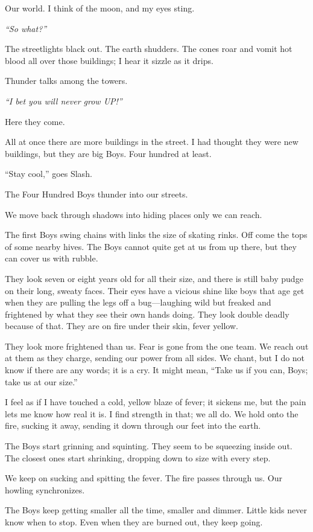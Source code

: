 Our world. I think of the moon, and my eyes sting.

\textit{``So what?''}

The streetlights black out. The earth shudders. The cones roar and vomit hot blood all over those buildings; I hear it sizzle as it drips.

Thunder talks among the towers.

\textit{``I bet you will never grow UP!''}

Here they come.

All at once there are more buildings in the street. I had thought they were new buildings, but they are big Boys. Four hundred at least.

``Stay cool,'' goes Slash.

The Four Hundred Boys thunder into our streets.

We move back through shadows into hiding places only we can reach.

The first Boys swing chains with links the size of skating rinks. Off come the tops of some nearby hives. The Boys cannot quite get at us from up there, but they can cover us with rubble.

They look seven or eight years old for all their size, and there is still baby pudge on their long, sweaty faces. Their eyes have a vicious shine like boys that age get when they are pulling the legs off a bug—laughing wild but freaked and frightened by what they see their own hands doing. They look double deadly because of that. They are on fire under their skin, fever yellow.

They look more frightened than us. Fear is gone from the one team. We reach out at them as they charge, sending our power from all sides. We chant, but I do not know if there are any words; it is a cry. It might mean, ``Take us if you can, Boys; take us at our size.''

I feel as if I have touched a cold, yellow blaze of fever; it sickens me, but the pain lets me know how real it is. I find strength in that; we all do. We hold onto the fire, sucking it away, sending it down through our feet into the earth.

The Boys start grinning and squinting. They seem to be squeezing inside out. The closest ones start shrinking, dropping down to size with every step.

We keep on sucking and spitting the fever. The fire passes through us. Our howling synchronizes.

The Boys keep getting smaller all the time, smaller and dimmer. Little kids never know when to stop. Even when they are burned out, they keep going.

